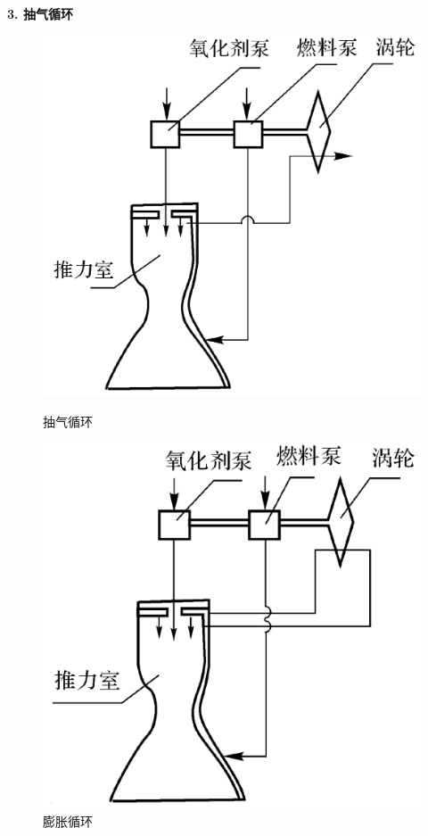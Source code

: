\vspace*{0.5em}

\noindent \textbf{3. 抽气循环}


{
	\begin{figure}[!htb]
		\centering
		\begin{minipage}{0.45\linewidth}
			\centering
			\includegraphics[width=0.7\linewidth]{pic/抽气循环.png}
			\caption{抽气循环}
		\end{minipage}
		\begin{minipage}{0.45\linewidth}
			\centering
			\includegraphics[width=0.682\linewidth]{pic/膨胀循环.png}
			\caption{膨胀循环}
		\end{minipage}
	\end{figure}
}

